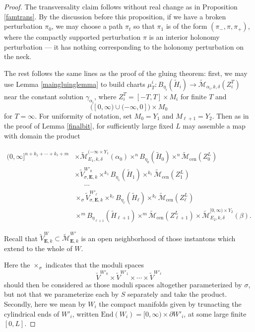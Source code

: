 \documentclass{memo-l}
\theoremstyle{definition}
\theoremstyle{remark}
\numberwithin{section}{chapter}
\numberwithin{equation}{chapter}
\begin{document}
\begin{proof}
The transversality claim follows without real change as in Proposition \ref{famtrans}. By the discussion before this proposition, if we have a broken perturbation $\pi_0$, we may choose a path $\pi_t$ so that $\pi_1$ is of the form $(\pi_-, \pi, \pi_+)$, where the compactly supported perturbation $\pi$ is an interior holonomy perturbation --- it has nothing corresponding to the holonomy perturbation on the neck.

The rest follows the same lines as the proof of the gluing theorem: first, we may use Lemma \ref{maingluinglemma} to build charts $\mu^i_T: B_{\eta_i}(\widetilde H_i) \to \widetilde{\mathcal M}_{\alpha_i, k, \delta}(Z_i^T)$ near the constant solution $\gamma_{\alpha_i}$, where $Z_i^T = [-T, T] \times M_i$ for finite $T$ and $$\big([0, \infty) \cup (-\infty, 0]\big) \times M_0$$ for $T = \infty$. For uniformity of notation, set $M_0 = Y_1$ and $M_{\ell+1} = Y_2$. Then as in the proof of Lemma \ref{finalbit}, for sufficiently large fixed $L$ may assemble a map with domain the product

\begin{align*}(0,\infty]^{n+k_1 + \cdots + k_\ell + m} &\times \widetilde{\mathcal M}^{(-\infty \times Y_1}_{E_1, k, \delta}(\alpha_0) \times^n B_{\eta_0}(\widetilde H_0) \times^n \widetilde{\mathcal M}_{\text{cen}}(Z^L_0)\\
&\times \widetilde{V}^{W'_0}_{\sigma,\mathbf{E},k} \times^{k_1} B_{\eta_1}(\widetilde H_1) \times^{k_1} \widetilde{\mathcal M}_{\text{cen}}(Z^L_1)\\
&\;\;\;\;\;\cdots\\
&\times_\sigma \widetilde{V}^{W'_\ell}_{\sigma,\mathbf{E},k} \times^{k_\ell} B_{\eta_\ell}(\widetilde H_\ell) \times^{k_\ell} \widetilde{\mathcal M}_{\text{cen}}(Z^L_\ell)\\
&\times^m B_{\eta_{\ell+1}}(\widetilde H_{\ell+1}) \times^m \widetilde{\mathcal M}_{\text{cen}}(Z^L_{\ell+1}) \times \widetilde{\mathcal M}^{[0,\infty) \times Y_2}_{E_2,k,\delta}(\beta).
\end{align*}

Recall that $\widetilde{V}^W_{\mathbf{E}, k} \subset \widetilde{\mathcal M}^{W'}_{\mathbf{E}, k}$ is an open neighborhood of those instantons which extend to the whole of $W$.

Here the $\times_\sigma$ indicates that the moduli spaces $$\widetilde{V}^{W'_0} \times \widetilde{V}^{W'_1} \times \cdots \times \widetilde{V}^{W'_\ell}$$ should then be considered as those moduli spaces altogether parameterized by $\sigma$, but not that we parameterize each by $S$ separately and take the product. Secondly, here we mean by $W_i$ the compact manifolds given by trunacting the cylindrical ends of $W'_i$, written $\text{End}(W_i) = [0, \infty) \times \partial W'_i$, at some large finite $[0, L]$.


\end{proof}
\end{document}
